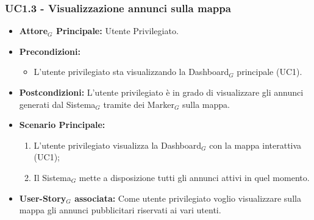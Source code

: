 \documentclass[10pt]{article}
\begin{document}
\begin{justify}
\subsubsection{\textbf{UC1.3 - Visualizzazione annunci sulla mappa}}
\label{UC1.3}
\begin{itemize}
    \item \textbf{Attore$_G$ Principale:} Utente Privilegiato.
    \item \textbf{Precondizioni:} 
        \begin{itemize}
    	\item L'utente privilegiato sta visualizzando la Dashboard$_G$ principale (UC1).
        \end{itemize}
     \item \textbf{Postcondizioni:} L'utente privilegiato è in grado di visualizzare gli annunci generati dal Sistema$_G$ tramite dei Marker$_G$ sulla mappa.
    \item \textbf{Scenario Principale:} 
      \begin{enumerate}
      \item L'utente privilegiato visualizza la Dashboard$_G$ con la mappa interattiva (UC1);
            \item Il Sistema$_G$ mette a disposizione tutti gli annunci attivi in quel momento.
	\end{enumerate}
    \item \textbf{User-Story$_G$ associata:} Come utente privilegiato voglio visualizzare sulla mappa gli annunci pubblicitari riservati ai vari utenti.
\end{itemize}

\end{justify}
\end{document}
